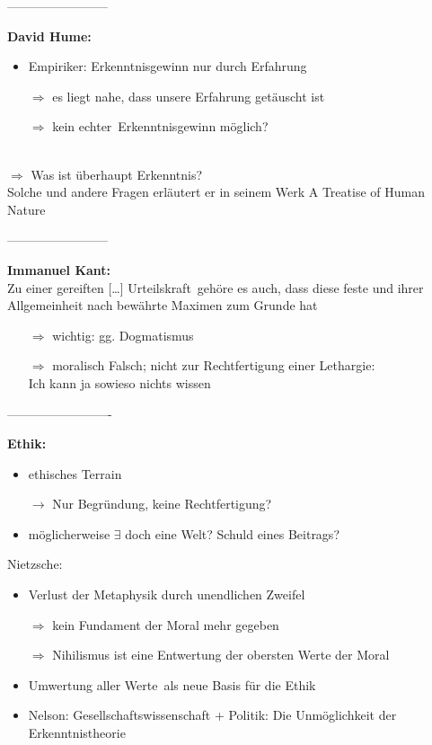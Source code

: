 \documentclass[12pt,a4paper]{article}
\begin{document}
------------------------


\textbf{David Hume:}
\begin{itemize}
\item Empiriker: Erkenntnisgewinn nur durch Erfahrung
\item[$\Rightarrow$] es liegt nahe, dass unsere Erfahrung getäuscht ist
\item[$\Rightarrow$] kein \glqq echter\grqq\ Erkenntnisgewinn möglich?
\end{itemize}
\ \\
$\Rightarrow$ Was ist überhaupt \glqq Erkenntnis\grqq ?\\
Solche und andere Fragen erläutert er in seinem Werk  \glqq A Treatise of Human Nature\grqq


------------------------


\textbf{Immanuel Kant:}\\
Zu einer  \glqq gereiften [\ldots] Urteilskraft\grqq\ gehöre es auch, dass diese \glqq feste und ihrer Allgemeinheit nach bewährte Maximen zum Grunde hat\grqq\
\begin{itemize}
\item[$\Rightarrow$] wichtig: gg. Dogmatismus
\item[$\Rightarrow$] moralisch Falsch; nicht zur Rechtfertigung einer Lethargie:\\
\glqq Ich kann ja sowieso nichts wissen\grqq
\end{itemize}

-------------------------

\textbf{Ethik:}
\begin{itemize}
\item ethisches Terrain
\item[$\rightarrow$] Nur Begründung, keine Rechtfertigung?
\item möglicherweise $\exists$ doch eine Welt? Schuld eines Beitrags?
\end{itemize}
Nietzsche:\\
\begin{itemize}
\item Verlust der Metaphysik durch unendlichen Zweifel
\item[$\Rightarrow$] kein Fundament der Moral mehr gegeben
\item[$\Rightarrow$] Nihilismus ist eine Entwertung der obersten Werte der Moral
\item \glqq Umwertung aller Werte\grqq\ als neue Basis für die Ethik
\item Nelson: Gesellschaftswissenschaft + Politik: \glqq Die Unmöglichkeit der Erkenntnistheorie\grqq\ 
\end{itemize}
\end{document}
